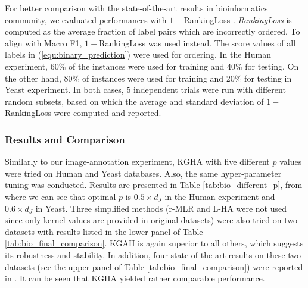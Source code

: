 \documentclass[a4paper]{article}
\begin{document}
For better comparison with the state-of-the-art results in bioinformatics community, we evaluated performances with $1-$RankingLoss \cite{Yu_2012_KDD,Yu_2013_TBioinfo}.  
\emph{RankingLoss} is computed as the average fraction of label pairs which are incorrectly ordered. To align with Macro F1, $1-$RankingLoss was used instead.  
The score values of all labels in (\ref{equ:binary_prediction}) were used for ordering. 
In the \textsf{Human} experiment, 60\% of the instances were used for training and 40\% for testing. 
On the other hand, 80\% of instances were used for training and 20\% for testing in \textsf{Yeast} experiment. In both cases,  
5 independent trials were run with different random subsets, based on which 
the average and standard deviation of $1-$RankingLoss were computed and reported.    


\subsubsection{Results and Comparison}
Similarly to our image-annotation experiment, KGHA with five different $p$ values were tried on  \textsf{Human} and  \textsf{Yeast} databases. 
Also, the same hyper-parameter tuning was conducted. 
Results are presented in Table \ref{tab:bio_different_p}, 
from where we can see that optimal $p$ is $0.5\times d_J$ in the \textsf{Human} experiment and $0.6\times d_J$ in \textsf{Yeast}.
Three simplified methods (r-MLR and L-HA were not 
used since only kernel values are provided in original datasets) were also tried on two datasets with results 
listed in the lower panel of Table \ref{tab:bio_final_comparison}. 
KGAH is again superior to all others, which suggests its robustness and 
stability. In addition, four state-of-the-art results on these two datasets (see the upper panel of Table \ref{tab:bio_final_comparison}) were reported 
in \citeauthor{Yu_2013_TBioinfo} \cite{Yu_2012_KDD,Yu_2013_TBioinfo}. It can be seen that KGHA yielded rather comparable performance.     
\end{document}
